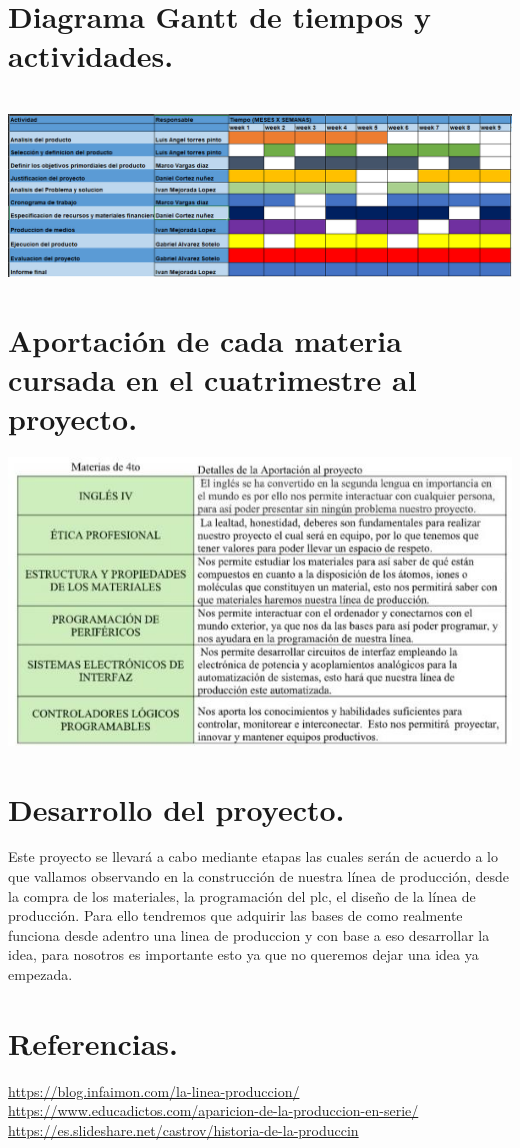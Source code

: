 \documentclass[10pt,a4paper]{article}
\begin{document}
\section{Diagrama Gantt de tiempos y actividades.}\\
\includegraphics[scale=.42]{gantt.png} 
\\
\raggedright
\section{Aportación de cada materia cursada en el cuatrimestre al proyecto.}
\includegraphics[scale=.70]{tabla.jpeg} 
\\
\section{Desarrollo del proyecto.}
Este proyecto se llevará a cabo mediante etapas las cuales serán de acuerdo a lo que vallamos observando en la construcción de nuestra línea de producción, desde la compra de los materiales, la programación del plc, el diseño de la línea de producción. Para ello tendremos que adquirir las bases de como realmente funciona desde adentro una linea de produccion y con base a eso desarrollar la idea, para nosotros es importante esto ya que no queremos dejar una idea ya empezada. 
\\
\section{Referencias.}
\url{https://blog.infaimon.com/la-linea-produccion/}
\url{https://www.educadictos.com/aparicion-de-la-produccion-en-serie/}
\url{https://es.slideshare.net/castrov/historia-de-la-produccin}
\end{document}
